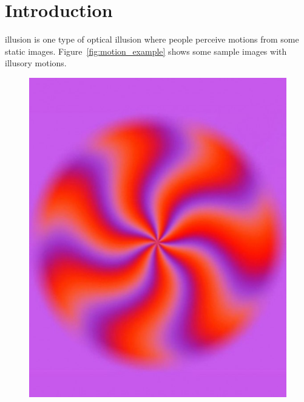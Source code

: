 \documentclass[journal]{IEEEtran}
\begin{document}
\section{Introduction}
\label{sec:intro}
 illusion is one type of optical illusion where people perceive motions from some static images.
Figure~\ref{fig:motion_example} shows some sample images with illusory motions.
\begin{figure}[h]
	\centering
	\begin{minipage}{0.48\linewidth}
		\includegraphics[width=\linewidth]{fig/illusion_eg.jpg}
	\end{minipage}\hfill
	\begin{minipage}{0.48\linewidth}

\end{minipage}
\end{figure}
\end{document}

